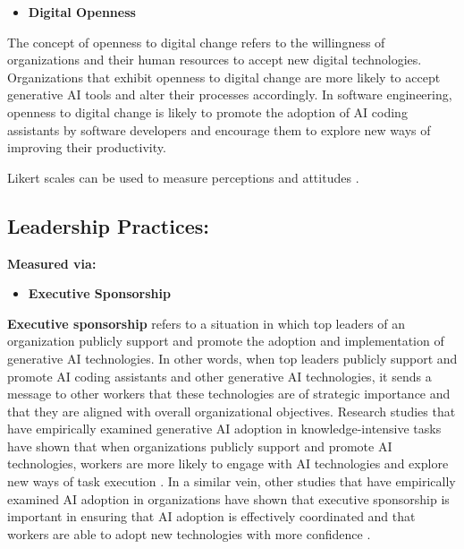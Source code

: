 \begin{itemize}
	\item \textbf{Digital Openness} 
\end{itemize}
The concept of openness to digital change refers to the willingness of organizations and their human resources to accept new digital technologies. Organizations that exhibit openness to digital change are more likely to accept generative AI tools and alter their processes accordingly. In software engineering, openness to digital change is likely to promote the adoption of AI coding assistants by software developers and encourage them to explore new ways of improving their productivity. 

Likert scales can be used to measure perceptions and attitudes \autocite{Bryman2016}.

\subsection {Leadership Practices: }
\label{sec:Leadership Practices}
\textbf{Measured via:}
\begin{itemize}
	\item \textbf{Executive Sponsorship} 
\end{itemize}
\textbf{Executive sponsorship} refers to a situation in which top leaders of an organization publicly support and promote the adoption and implementation of generative AI technologies. In other words, when top leaders publicly support and promote AI coding assistants and other generative AI technologies, it sends a message to other workers that these technologies are of strategic importance and that they are aligned with overall organizational objectives. Research studies that have empirically examined generative AI adoption in knowledge-intensive tasks have shown that when organizations publicly support and promote AI technologies, workers are more likely to engage with AI technologies and explore new ways of task execution \autocite{Noy2023}. In a similar vein, other studies that have empirically examined AI adoption in organizations have shown that executive sponsorship is important in ensuring that AI adoption is effectively coordinated and that workers are able to adopt new technologies with more confidence \autocite{Brynjolfsson2025}.

